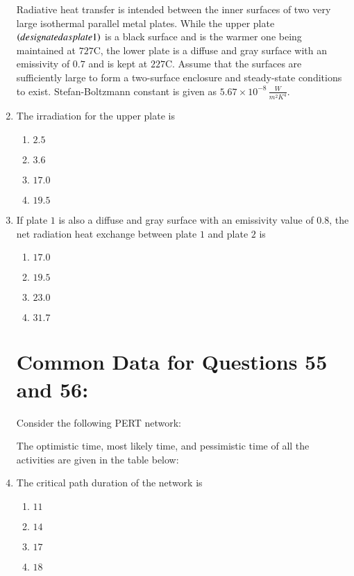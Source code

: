 \documentclass[journal,12pt,twocolumn]{IEEEtran}
\theoremstyle{remark}
\begin{document}
\begin{enumerate}[start=49]
    Radiative heat transfer is intended between the inner surfaces of two very large isothermal parallel metal plates. While the upper plate $\left(designated as plate 1\right)$ is a black surface and is the warmer one being maintained at $727 $\degree C, the lower plate  is a diffuse and gray surface with an emissivity of $0.7$ and is kept at $227 $\degree C. Assume that the surfaces are sufficiently large to form a two-surface enclosure and steady-state conditions to exist. Stefan-Boltzmann constant is given as $5.67 \times 10^{-8} \, \frac{W}{{m}^2{K}^4}$.

\item The irradiation  for the upper plate  is


    \begin{enumerate}
        \item $2.5$
        \item $3.6$
        \item $17.0$
        \item $19.5$
    \end{enumerate}

    \item If plate $1$ is also a diffuse and gray surface with an emissivity value of $0.8$, the net radiation heat exchange  between plate $1$ and plate $2$ is
    \begin{enumerate}
        \item $17.0$
        \item $19.5$
        \item $23.0$
        \item $31.7$
    \end{enumerate} 

\section{ Common Data for Questions 55 and 56:}
    
    Consider the following PERT network:
    
   

    The optimistic time, most likely time, and pessimistic time of all the activities are given in the table below:
    
    
    \item The critical path duration of the network  is
    \begin{enumerate}
        \item $11$
        \item $14$
        \item $17$
        \item $18$
    \end{enumerate}


\end{enumerate}
\end{document}
